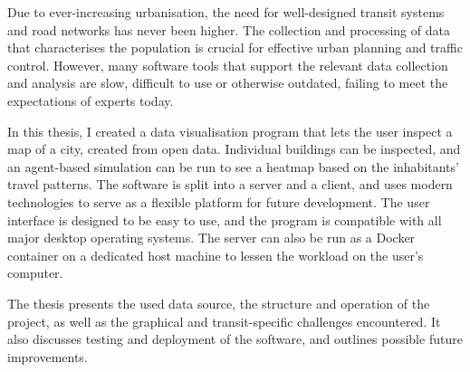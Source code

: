 Due to ever-increasing urbanisation, the need for well-designed transit systems and road networks has never been higher. The collection and processing of data that characterises the population is crucial for effective urban planning and traffic control. However, many software tools that support the relevant data collection and analysis are slow, difficult to use or otherwise outdated, failing to meet the expectations of experts today.

In this thesis, I created a data visualisation program that lets the user inspect a map of a city, created from open data. Individual buildings can be inspected, and an agent-based simulation can be run to see a heatmap based on the inhabitants' travel patterns. The software is split into a server and a client, and uses modern technologies to serve as a flexible platform for future development. The user interface is designed to be easy to use, and the program is compatible with all major desktop operating systems. The server can also be run as a Docker container on a dedicated host machine to lessen the workload on the user's computer.

The thesis presents the used data source, the structure and operation of the project, as well as the graphical and transit-specific challenges encountered. It also discusses testing and deployment of the software, and outlines possible future improvements.






\vfill
\selectthesislanguage

\setcounter{romanPage}{\value{page}}
